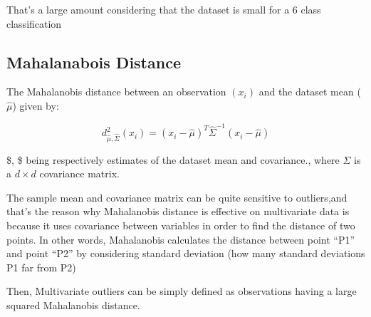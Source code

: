 \documentclass[11pt]{article}
\begin{document}
That's a large amount considering that the dataset is small for a 6
class classification

    \hypertarget{mahalanabois-distance}{%
\subsection{Mahalanabois Distance}\label{mahalanabois-distance}}

The Mahalanobis distance between an observation \((x_i)\) and the
dataset mean (\(\hat{\mu}\)) given by:

\begin{equation}
d^2_{\hat{\mu},\hat{\Sigma}}(x_i) =
(x_i-\hat{\mu})^T\hat{\Sigma}^{-1}(x_i-\hat{\mu})
\end{equation}

\$\hat{\mu}, \hat{\Sigma} \$ being respectively estimates of the dataset
mean and covariance., where \(\Sigma\) is a \(d\times d\) covariance
matrix.

The sample mean and covariance matrix can be quite sensitive to
outliers,and that's the reason why Mahalanobis distance is effective on
multivariate data is because it uses covariance between variables in
order to find the distance of two points. In other words, Mahalanobis
calculates the distance between point ``P1'' and point ``P2'' by
considering standard deviation (how many standard deviations P1 far from
P2)

Then, Multivariate outliers can be simply defined as observations having
a large squared Mahalanobis distance.
\end{document}
